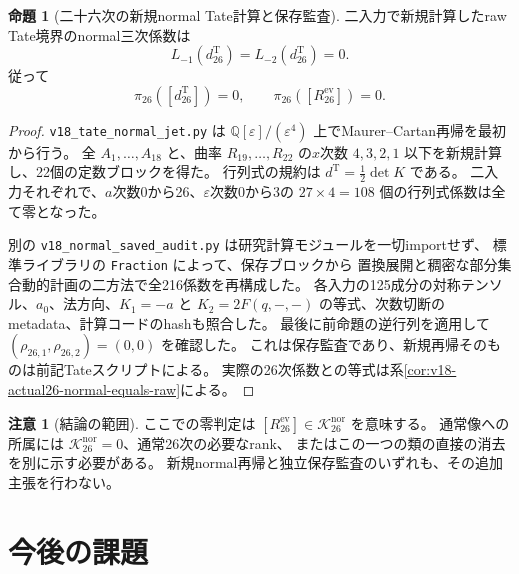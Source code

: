 \documentclass[a4paper,11pt]{ltjsarticle}
\theoremstyle{definition}
\newtheorem{remark}[theorem]{注意}
\newtheorem{proposition}[theorem]{命題}
\begin{document}
\begin{proposition}[二十六次の新規normal Tate計算と保存監査]
\label{prop:v18-normal26-tate-zero}
二入力で新規計算したraw Tate境界のnormal三次係数は
\[
 L_{-1}(d_{26}^{\mathrm T})=L_{-2}(d_{26}^{\mathrm T})=0.
\]
従って
\[
 \pi_{26}([d_{26}^{\mathrm T}])=0,\qquad
 \pi_{26}([R_{26}^{\mathrm{ev}}])=0.
\]
\end{proposition}
\begin{proof}
\texttt{v18\_tate\_normal\_jet.py} は
$\mathbb Q[\varepsilon]/(\varepsilon^4)$ 上でMaurer--Cartan再帰を最初から行う。
全 $A_1,\ldots,A_{18}$ と、曲率 $R_{19},\ldots,R_{22}$ の$x$次数
$4,3,2,1$ 以下を新規計算し、22個の定数ブロックを得た。
行列式の規約は $d^{\mathrm T}=\tfrac12\det K$ である。
二入力それぞれで、$a$次数0から26、$\varepsilon$次数0から3の
$27\times4=108$ 個の行列式係数は全て零となった。

別の \texttt{v18\_normal\_saved\_audit.py} は研究計算モジュールを一切importせず、
標準ライブラリの \texttt{Fraction} によって、保存ブロックから
置換展開と稠密な部分集合動的計画の二方法で全216係数を再構成した。
各入力の125成分の対称テンソル、$a_0$、法方向、$K_1=-a$ と
$K_2=2F(q,-,-)$ の等式、次数切断のmetadata、計算コードのhashも照合した。
最後に前命題の逆行列を適用して $(\rho_{26,1},\rho_{26,2})=(0,0)$ を確認した。
これは保存監査であり、新規再帰そのものは前記Tateスクリプトによる。
実際の26次係数との等式は系\ref{cor:v18-actual26-normal-equals-raw}による。
\end{proof}

\begin{remark}[結論の範囲]
ここでの零判定は $[R_{26}^{\mathrm{ev}}]\in\mathcal K_{26}^{\mathrm{nor}}$ を意味する。
通常像への所属には $\mathcal K_{26}^{\mathrm{nor}}=0$、通常26次の必要なrank、
またはこの一つの類の直接の消去を別に示す必要がある。
新規normal再帰と独立保存監査のいずれも、その追加主張を行わない。
\end{remark}


\clearpage
\section{今後の課題}
\end{document}
